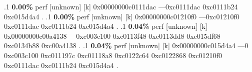\begin{profile}
{.1 \textbf{ 0.00\%} perf             [unknown]              [k] 0x00000000c0111dac\newline {} ---0xc0111dac\newline {} 0xc0111b24\newline {} 0xc015d4a4\newline {} . 
.1 \textbf{ 0.00\%} perf             [unknown]              [k] 0x00000000c01210f0\newline {} ---0xc01210f0\newline {} 0xc0111dac\newline {} 0xc0111b24\newline {} 0xc015d4a4\newline {} . 
.1 \textbf{ 0.04\%} perf             [unknown]              [k] 0x00000000c00a4138\newline {} ---0xc003c100\newline {} 0xc0113f48\newline {} 0xc0113dd8\newline {} 0xc015df68\newline {} 0xc0134b88\newline {} 0xc00a4138\newline {} . 
.1 \textbf{ 0.04\%} perf             [unknown]              [k] 0x00000000c015d4a4\newline {} ---0\newline {} 0xc003c100\newline {} 0xc011197c\newline {} 0xc01118a8\newline {} 0xc0122c64\newline {} 0xc0122868\newline {} 0xc01210f0\newline {} 0xc0111dac\newline {} 0xc0111b24\newline {} 0xc015d4a4\newline {} . 
}
\end{profile}

